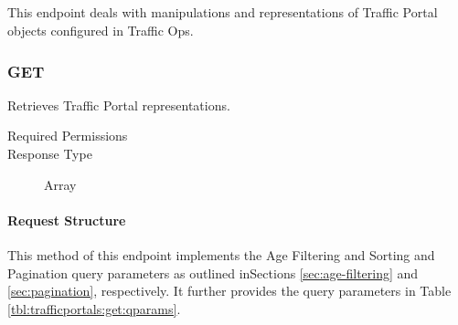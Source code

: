 %
%

\subsection{}
This endpoint deals with manipulations and representations of Traffic Portal
objects configured in Traffic Ops.

\subsubsection{GET}
Retrieves Traffic Portal representations.
\begin{description}
	\item[Required Permissions] 
	\item[Response Type] Array
\end{description}

\paragraph{Request Structure}
This method of this endpoint implements the Age Filtering and Sorting and
Pagination query parameters as outlined inSections \ref{sec:age-filtering} and
\ref{sec:pagination}, respectively. It further provides the query parameters in
Table \ref{tbl:trafficportals:get:qparams}.

